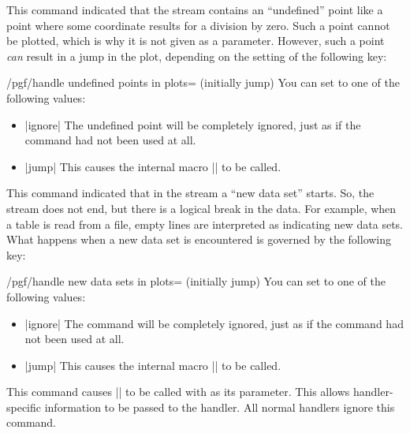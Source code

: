 \begin{command}{\pgfplotstreampointundefined}
    This command indicated that the stream contains an ``undefined'' point like
    a point where some coordinate results for a division by zero. Such a point
    cannot be plotted, which is why it is not given as a parameter. However,
    such a point \emph{can} result in a jump in the plot, depending on the
    setting of the following key:
    \begin{key}{/pgf/handle undefined points in plots= (initially jump)}
        You can set  to one of the following values:
        \begin{itemize}
            \item |ignore| The undefined point will be completely ignored, just
                as if the command had not been used at all.
            \item |jump| This causes the internal macro |\pgf@plotstreamjump|
                to be called.
        \end{itemize}
    \end{key}
\end{command}

\begin{command}{\pgfplotstreamnewdataset}
    This command indicated that in the stream a ``new data set'' starts. So,
    the stream does not end, but there is a logical break in the data. For
    example, when a table is read from a file, empty lines are interpreted as
    indicating new data sets. What happens when a new data set is encountered
    is governed by the following key:
    \begin{key}{/pgf/handle new data sets in plots= (initially jump)}
        You can set  to one of the following values:
        \begin{itemize}
            \item |ignore| The command will be completely ignored, just as if
                the command had not been used at all.
            \item |jump| This causes the internal macro |\pgf@plotstreamjump|
                to be called.
        \end{itemize}
    \end{key}
\end{command}

\begin{command}{\pgfplotstreamspecial{}}
    This command causes |\pgf@plotstreamspecial| to be called with 
    as its parameter. This allows handler-specific information to be passed to
    the handler. All normal handlers ignore this command.
\end{command}

